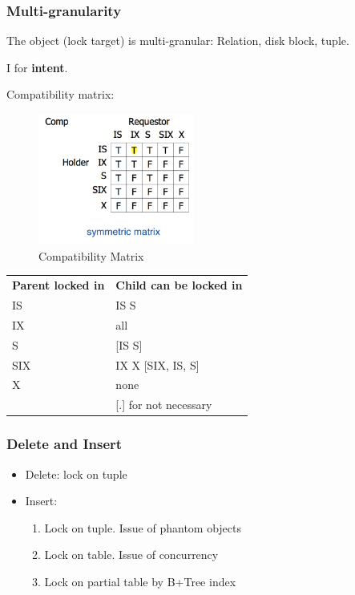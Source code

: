 \documentclass[a4paper]{report}
\begin{document}
\subsubsection{Multi-granularity}
The object (lock target) is multi-granular: Relation, disk block, tuple.

I for \textbf{intent}.

Compatibility matrix:
\begin{figure}[H]
    \centerline{\includegraphics[height = 1.7in]{img/lockModes}}
    \caption{Compatibility Matrix}
  \label{fig:compatibilityMatrix}
\end{figure}

\begin{tabular}{ll}
\hline\noalign{\smallskip}
\textbf{Parent locked in} & \textbf{Child can be locked in} \\
\noalign{\smallskip}\hline\noalign{\smallskip}
IS & IS S \\
IX & all \\
S & [IS S] \\
SIX & IX X [SIX, IS, S] \\
X & none\\
\noalign{\smallskip}\hline\noalign{\smallskip}
\caption{Hierarchy & [.] for not necessary}
\end{tabular}


\subsubsection{Delete and Insert}
\begin{itemize}
\item Delete: lock on tuple
\item Insert:
\begin{enumerate}
\item Lock on tuple. Issue of phantom objects
\item Lock on table. Issue of concurrency
\item Lock on partial table by B+Tree index
\end{enumerate}
\end{itemize}
\end{document}
